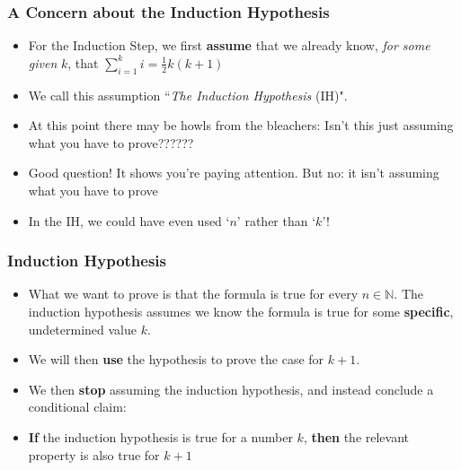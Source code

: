  \begin{frame}
\frametitle{A Concern about the Induction Hypothesis}

\begin{itemize}[<+->]
\item For the Induction Step, we first {\bf{assume}} that we already know, \textit{for some given} $k$, that $\displaystyle\sum_{i=1}^k i = \frac{1}{2}k(k+1)$

\item We call this assumption ``{\it{The Induction Hypothesis}} (IH)".

\item At this point there may be howls from the bleachers: Isn't this just assuming what you have to prove??????

\item Good question! It shows you're paying attention. But no: it isn't assuming what you have to prove

\item In the IH, we could have even used `$n$' rather than `$k$'! 
 
 
\end{itemize} 
\end{frame}

 \begin{frame}
\frametitle{Induction Hypothesis}

\begin{itemize}[<+->]
\item What we want to prove is that the formula is true for every $n \in \mathbb{N}$. The induction hypothesis assumes we know the formula is true for some {\bf{specific}}, undetermined value $k$.\\
 
\item We will then {\bf{use}} the hypothesis to prove the case for $k+1$. 

\item We then {\bf{stop}} assuming the induction hypothesis, and instead conclude a conditional claim:

\item {\bf{If}} the induction hypothesis is true for a number $k$, {\bf{then}} the relevant property is also true for $k+1$

\end{itemize} 
\end{frame}

